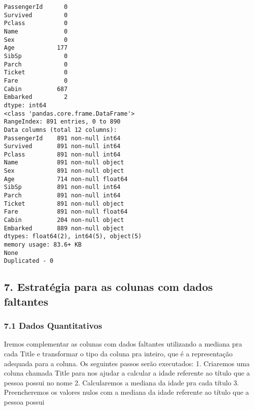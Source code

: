 \documentclass[11pt]{article}
\begin{document}
    \begin{Verbatim}[commandchars=\\\{\}]
PassengerId      0
Survived         0
Pclass           0
Name             0
Sex              0
Age            177
SibSp            0
Parch            0
Ticket           0
Fare             0
Cabin          687
Embarked         2
dtype: int64
<class 'pandas.core.frame.DataFrame'>
RangeIndex: 891 entries, 0 to 890
Data columns (total 12 columns):
PassengerId    891 non-null int64
Survived       891 non-null int64
Pclass         891 non-null int64
Name           891 non-null object
Sex            891 non-null object
Age            714 non-null float64
SibSp          891 non-null int64
Parch          891 non-null int64
Ticket         891 non-null object
Fare           891 non-null float64
Cabin          204 non-null object
Embarked       889 non-null object
dtypes: float64(2), int64(5), object(5)
memory usage: 83.6+ KB
None
Duplicated - 0

    \end{Verbatim}

    \subsection{7. Estratégia para as colunas com dados
faltantes}\label{estratuxe9gia-para-as-colunas-com-dados-faltantes}

\subsubsection{7.1 Dados Quantitativos}\label{dados-quantitativos}

Iremos complementar as colunas com dados faltantes utilizando a mediana
pra cada Title e transformar o tipo da coluna pra inteiro, que é a
representação adequada para a coluna. Os seguintes passos serão
executados: 1. Criaremos uma coluna chamada Title para nos ajudar a
calcular a idade referente ao título que a pessoa possui no nome 2.
Calcularemos a mediana da idade pra cada título 3. Preencheremos os
valores nulos com a mediana da idade referente ao título que a pessoa
possui
\end{document}
